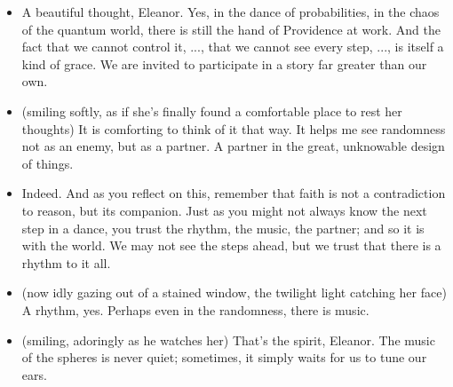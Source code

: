 \begin{itemize}[leftmargin=2cm,labelsep=1em]
  \item[\textbf{Priest:}] 
  A beautiful thought, Eleanor. 
  Yes, in the dance of probabilities, in the chaos of the quantum world, there is still the hand of Providence at work. 
  And the fact that we cannot control it, ...,  that we cannot see every step, ..., is itself a kind of grace. 
  We are invited to participate in a story far greater than our own.

  \item[\textbf{Eleanor :}] (smiling softly, as if she’s finally found a comfortable place to rest her thoughts)
  It is comforting to think of it that way. 
  It helps me see randomness not as an enemy, but as a partner. 
  A partner in the great, unknowable design of things.

  \item[\textbf{Priest:}] 
  Indeed. And as you reflect on this, remember that faith is not a contradiction to reason, but its companion. 
  Just as you might not always know the next step in a dance, you trust the rhythm, the music, the partner; and so it is with the world. 
  We may not see the steps ahead, but we trust that there is a rhythm to it all.

  \item[\textbf{Eleanor:}] (now idly gazing out of a stained window, the twilight light catching her face)
  A rhythm, yes. Perhaps even in the randomness, there is music.

  \item[\textbf{Priest:}] (smiling, adoringly as he watches her)
  That’s the spirit, Eleanor. The music of the spheres is never quiet; sometimes, it simply waits for us to tune our ears.

\end{itemize}

